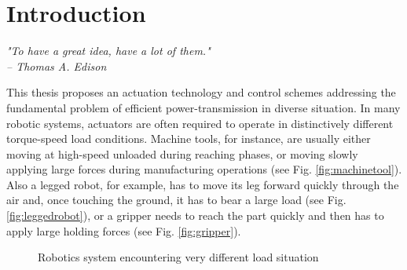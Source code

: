 \chapter{Introduction}
\label{sec:Introduction}

{
\begin{flushright}
\textit{"To have a great idea, have a lot of them."} \\
\emph{-- Thomas A. Edison}
\end{flushright}
}
\vspace{10pt}



This thesis proposes an actuation technology and control schemes addressing the fundamental problem of efficient power-transmission in diverse situation. In many robotic systems, actuators are often required to operate in distinctively different torque-speed load conditions. Machine tools, for instance, are usually either moving at high-speed unloaded during reaching phases, or moving slowly applying large forces during manufacturing operations (see Fig. \ref{fig:machinetool}). Also a legged robot, for example, has to move its leg forward quickly through the air and, once touching the ground, it has to bear a large load (see Fig. \ref{fig:leggedrobot}), or a gripper needs to reach the part quickly and then has to apply large holding forces (see Fig. \ref{fig:gripper}).
%
\begin{figure}[H]
        \centering
        \caption{Robotics system encountering very different load situation}
				\label{fig:app}
\end{figure}

